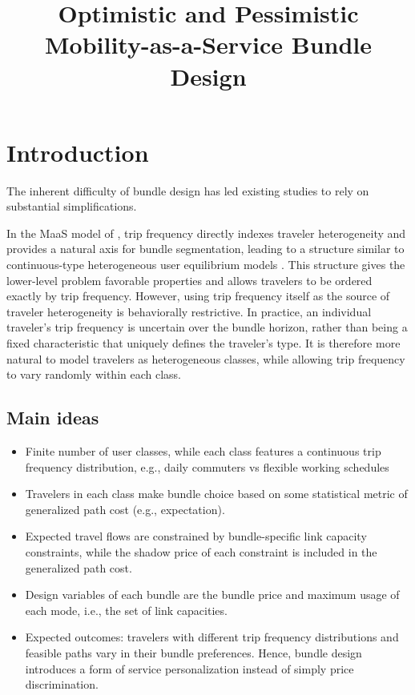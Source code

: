 \documentclass{article}
\title{Optimistic and Pessimistic Mobility-as-a-Service Bundle Design}
\newcommand{\jl}[1]{{\color{blue}{\noindent #1}}}
\begin{document}
\maketitle

\section{Introduction}

\jl{What is real bunlde and why it's hard}

The inherent difficulty of bundle design has led existing studies to rely on substantial simplifications.

In the MaaS model of \citet{LiEtAlMaaSContinuous}, trip frequency directly indexes traveler heterogeneity and provides a natural axis for bundle segmentation, leading to a structure similar to continuous-type heterogeneous user equilibrium models \citep{dial1996,xie2026,Wang2026,xu2026}. This structure gives the lower-level problem favorable properties and allows travelers to be ordered exactly by trip frequency. However, using trip frequency itself as the source of traveler heterogeneity is behaviorally restrictive. In practice, an individual traveler’s trip frequency is uncertain over the bundle horizon, rather than being a fixed characteristic that uniquely defines the traveler’s type. It is therefore more natural to model travelers as heterogeneous classes, while allowing trip frequency to vary randomly within each class.

\subsection{Main ideas}
\begin{itemize}
    \item Finite number of user classes, while each class features a continuous trip frequency distribution, e.g., daily commuters vs flexible working schedules
    \item Travelers in each class make bundle choice based on some statistical metric of generalized path cost (e.g., expectation). 
    \item Expected travel flows are constrained by bundle-specific link capacity constraints, while the shadow price of each constraint is included in the generalized path cost. 
    \item Design variables of each bundle are the bundle price and maximum usage of each mode, i.e., the set of link capacities. 
    \item Expected outcomes: travelers with different trip frequency distributions and feasible paths vary in their bundle preferences. Hence, bundle design introduces a form of service personalization instead of simply price discrimination.
\end{itemize}
\end{document}
